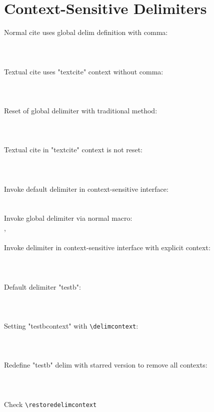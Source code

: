 \documentclass[a4paper]{article}
\newcommand{\cmd}[1]{\texttt{\textbackslash #1}}
\begin{document}
\section*{Context-Sensitive Delimiters}

Normal cite uses global delim definition with comma:\\\\
\cite{averroes/hannes}\\\\
Textual cite uses "textcite" context without comma:\\\\
\textcite{averroes/hannes}\\\\
Reset of global delimiter with traditional method:\\\\
\renewcommand*{\nametitledelim}{\addcomma\space}
\cite{averroes/hannes}\\\\
Textual cite in "textcite" context is not reset:\\\\
\textcite{averroes/hannes}\\\\
\begingroup
\def\addcomma{,}
\let\space\textvisiblespace
Invoke default delimiter in context-sensitive interface:\\
\\\\
Invoke global delimiter via normal macro:\\
\nametitledelim\\\\
Invoke delimiter in context-sensitive interface with explicit context:\\\\
\\\\
\endgroup
Default delimiter "testb":\\\\
\\\\
Setting "testbcontext" with \cmd{delimcontext}:\\\\
\\\\
Redefine "testb" delim with starred version to remove all contexts:\\\\
\\\\
Check \cmd{restoredelimcontext}\\\\
\\\\
\restoredelimcontext{}\\\\
\printbibliography
\end{document}
